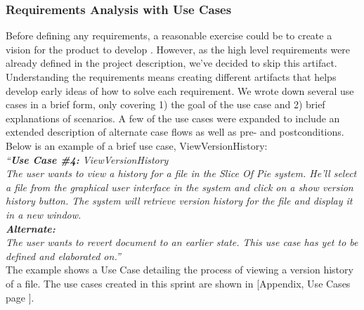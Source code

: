 \subsubsection{Requirements Analysis with Use Cases}
Before defining any requirements, a reasonable exercise could be to create a vision for the product to develop \cite[p.~58]{OOAD}. However, as the high level requirements were already defined in the project description, we’ve decided to skip this artifact.\\
\newline
Understanding the requirements means creating different artifacts that helps develop early ideas of how to solve each requirement. We wrote down several use cases in a brief form, only covering 1) the goal of the use case and 2) brief explanations of scenarios. A few of the use cases were expanded to include an extended description of alternate case flows as well as pre- and postconditions. Below is an example of a brief use case, ViewVersionHistory:\\
\textit{``\textbf{Use Case \#4:} ViewVersionHistory\\
The user wants to view a history for a file in the Slice Of Pie system. He’ll select a file from the graphical user interface in the system and click on a show version history button. The system will retrieve version history for the file and display it in a new window. \\
\textbf{Alternate:}\\
The user wants to revert document to an earlier state. This use case has yet to be defined and elaborated on.''}\\
\newline
The example shows a Use Case detailing the process of viewing a version history of a file.
The use cases created in this sprint are shown in [Appendix, Use Cases page \pageref{usecases}].
